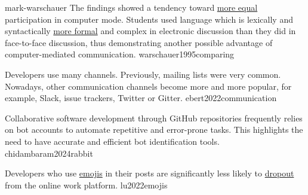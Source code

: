 \documentclass{article}
\begin{document}
\lnQuote
  {mark-warschauer}
  {The findings showed a tendency toward \ul{more equal} participation in computer mode. Students used language which is lexically and syntactically \ul{more formal} and complex in electronic discussion than they did in face-to-face discussion, thus demonstrating another possible advantage of computer-mediated communication.}
  {warschauer1995comparing}

  {Developers use many channels. Previously, mailing lists were very common. Nowadays, other communication channels become more and more popular, for example, Slack, issue trackers, Twitter or Gitter.}
  {ebert2022communication}


  {Collaborative software development through GitHub repositories frequently relies on bot accounts to automate repetitive and error-prone tasks. This highlights the need to have accurate and efficient bot identification tools.}
  {chidambaram2024rabbit}


  {Developers who use \ul{emojis} in their posts are significantly less likely to \ul{dropout} from the online work platform.}
  {lu2022emojis}
\end{document}
